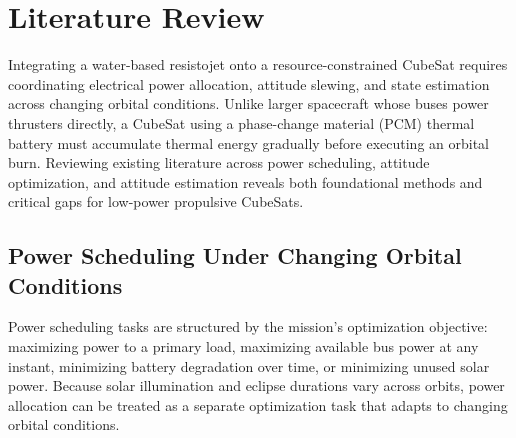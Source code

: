 

\section{Literature Review}

Integrating a water-based resistojet onto a resource-constrained CubeSat requires coordinating electrical power allocation, attitude slewing, and state estimation across changing orbital conditions. Unlike larger spacecraft whose buses power thrusters directly, a CubeSat using a phase-change material (PCM) thermal battery must accumulate thermal energy gradually before executing an orbital burn. Reviewing existing literature across power scheduling, attitude optimization, and attitude estimation reveals both foundational methods and critical gaps for low-power propulsive CubeSats.

\subsection{Power Scheduling Under Changing Orbital Conditions}

Power scheduling tasks are structured by the mission's optimization objective: maximizing power to a primary load, maximizing available bus power at any instant, minimizing battery degradation over time, or minimizing unused solar power. Because solar illumination and eclipse durations vary across orbits, power allocation can be treated as a separate optimization task that adapts to changing orbital conditions.

